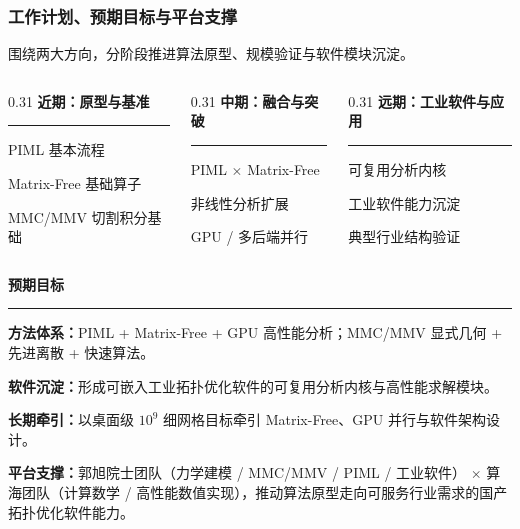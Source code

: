 \documentclass[notheorems]{beamer}
\newcommand{\accentintro}[1]{%
	\noindent{\color{structure.fg}\rule[-2pt]{3pt}{12pt}}\hspace{7pt}%
	\begin{minipage}[t]{\dimexpr\linewidth-13pt\relax}%
		\fontsize{8}{11.5}\selectfont\sffamily #1\end{minipage}\par}
\newcommand{\imglabel}[1]{%
	{\fontsize{8}{10}\selectfont\sffamily\bfseries\color{structure.fg}#1}\par\vspace{2pt}}
\begin{document}
	\begin{frame}
		\frametitle{工作计划、预期目标与平台支撑}

		\accentintro{围绕两大方向，分阶段推进算法原型、规模验证与软件模块沉淀。}

		\vspace{0.55em}
		\begin{columns}[T, totalwidth=\linewidth]
			\begin{column}{0.31\linewidth}
				\imglabel{近期：原型与基准}
				{\color{structure.fg!35}\rule{\linewidth}{0.7pt}}\vspace{0.36em}
				{\fontsize{7}{10.2}\selectfont\sffamily
					PIML 基本流程\par
					Matrix-Free 基础算子\par
					MMC/MMV 切割积分基础}
			\end{column}
			\begin{column}{0.31\linewidth}
				\imglabel{中期：融合与突破}
				{\color{structure.fg!35}\rule{\linewidth}{0.7pt}}\vspace{0.36em}
				{\fontsize{7}{10.2}\selectfont\sffamily
					PIML $\times$ Matrix-Free\par
					非线性分析扩展\par
					GPU / 多后端并行}
			\end{column}
			\begin{column}{0.31\linewidth}
				\imglabel{远期：工业软件与应用}
				{\color{structure.fg!35}\rule{\linewidth}{0.7pt}}\vspace{0.36em}
				{\fontsize{7}{10.2}\selectfont\sffamily
					可复用分析内核\par
					工业软件能力沉淀\par
					典型行业结构验证}
			\end{column}
		\end{columns}

		\vspace{0.95em}
		\imglabel{预期目标}
		{\color{structure.fg!35}\rule{\linewidth}{0.7pt}}\vspace{0.36em}
		{\fontsize{7.0}{10.2}\selectfont\sffamily
			\textbf{\color{structure.fg}方法体系：}PIML + Matrix-Free + GPU 高性能分析；MMC/MMV 显式几何 + 先进离散 + 快速算法。\par\vspace{3pt}
			\textbf{\color{structure.fg}软件沉淀：}形成可嵌入工业拓扑优化软件的可复用分析内核与高性能求解模块。\par\vspace{3pt}
			\textbf{\color{structure.fg}长期牵引：}以桌面级 $10^9$ 细网格目标牵引 Matrix-Free、GPU 并行与软件架构设计。}

		\vspace{0.65em}
		\accentintro{\textbf{平台支撑：}郭旭院士团队（力学建模 / MMC/MMV / PIML / 工业软件） $\times$ 算海团队（计算数学 / 高性能数值实现），推动算法原型走向可服务行业需求的国产拓扑优化软件能力。}
	\end{frame}
\end{document}
